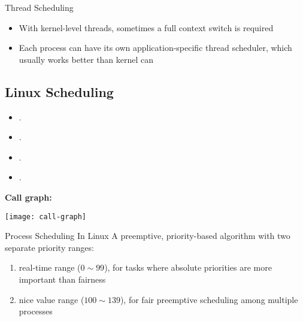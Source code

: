 \begin{frame}{Thread Scheduling}
  \begin{center}
     
  \end{center}
  \begin{itemize}
  \item With kernel-level threads, sometimes a full context switch is required
  \item Each process can have its own application-specific thread scheduler, which usually works
    better than kernel can
  \end{itemize}
\end{frame}

\subsection{Linux Scheduling}

\begin{itemize}
\item {}.
\item {}.
\item {}.
\item {}.
\end{itemize}

\textbf{Call graph:}
\begin{center}
  \texttt{[image: call-graph]}
\end{center}

\begin{frame}{Process Scheduling In Linux}
  A preemptive, priority-based algorithm with two separate priority ranges:
  \begin{enumerate}
  \item \alert{real-time} range ($0\sim{}99$), for tasks where absolute priorities are
    more important than fairness
  \item \alert{nice value} range ($100\sim{}139$), for fair preemptive scheduling among
    multiple processes
  \end{enumerate}
  \begin{center}
  \end{center}
\end{frame}

